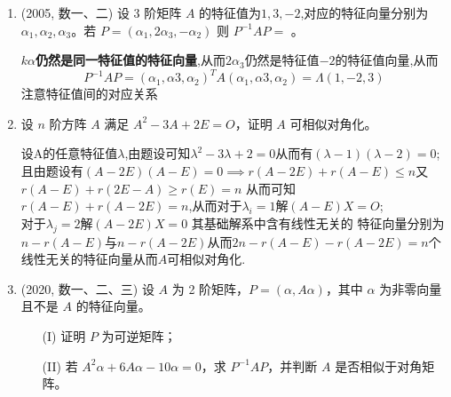 \documentclass[12pt, a4paper, oneside, UTF8]{ctexbook}
\begin{document}
\begin{enumerate}
    \item (2005, 数一、二) 设 3 阶矩阵 $A$ 的特征值为$1, 3, -2$,对应的特征向量分别为 $\alpha_1, \alpha_2, \alpha_3$。若
    $P = (\alpha_1, 2\alpha_3, -\alpha_2)$
    则 $P^{-1}AP = $ \underline{\hspace{3cm}}。
    
    \begin{solution}
    \textbf{$k\alpha$仍然是同一特征值的特征向量},从而$2\alpha_3$仍然是特征值$-2$的特征值向量,从而 
    $$
    P^{-1}AP=(\alpha_1,\alpha3,\alpha_2)^TA(\alpha_1,\alpha3,\alpha_2) = \Lambda(1,-2,3)
    $$
    注意特征值间的对应关系
    \end{solution}
    
    \item 设 $n$ 阶方阵 $A$ 满足 $A^2 - 3A + 2E = O$，证明 $A$ 可相似对角化。
    
    \begin{solution}
    设A的任意特征值$\lambda$,由题设可知$\lambda^2-3\lambda+2=0$从而有$(\lambda-1)(\lambda-2)=0$; \\
    且由题设有$(A-2E)(A-E)=0\implies r(A-2E)+r(A-E)\leq n$又$r(A-E)+r(2E-A)\geq r(E)= n$ 从而可知 
    $r(A-E)+r(A-2E)=n$,从而对于$\lambda_i=1$解$(A-E)X=O$;\\
    对于$\lambda_j=2$解$(A-2E)X=0$ 其基础解系中含有线性无关的
    特征向量分别为$n-r(A-E)$与$n-r(A-2E)$从而$2n-r(A-E)-r(A-2E)=n$个线性无关的特征向量从而$A$可相似对角化.
    \end{solution}
    
    \item (2020, 数一、二、三) 设 $A$ 为 2 阶矩阵，$P = (\alpha, A\alpha)$，其中 $\alpha$ 为非零向量且不是 $A$ 的特征向量。
    \begin{enumerate}
        \item [(I)] 证明 $P$ 为可逆矩阵；
        \item [(II)] 若 $A^2\alpha + 6A\alpha - 10\alpha = 0$，求 $P^{-1}AP$，并判断 $A$ 是否相似于对角矩阵。
    \end{enumerate}
    

\end{enumerate}
\end{document}
